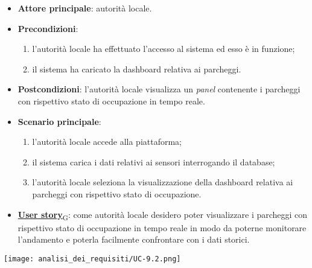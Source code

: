 \begin{itemize}
	\item \textbf{Attore principale}: autorità locale.
	\item \textbf{Precondizioni}:
	      \begin{enumerate}
		      \item l'autorità locale ha effettuato l'accesso al sistema ed esso è in funzione;
		      \item il sistema ha caricato la dashboard relativa ai parcheggi.
	      \end{enumerate}
	\item \textbf{Postcondizioni}: l'autorità locale visualizza un \textit{panel} contenente i parcheggi con rispettivo stato di occupazione in tempo reale.
	\item \textbf{Scenario principale}:
	      \begin{enumerate}
		      \item l'autorità locale accede alla piattaforma;
		      \item il sistema carica i dati relativi ai sensori interrogando il database;
		      \item l'autorità locale seleziona la visualizzazione della dashboard relativa ai parcheggi con rispettivo stato di occupazione.
	      \end{enumerate}
	\item \href{https://7last.github.io/docs/rtb/documentazione-interna/glossario\#user-story}{\textbf{User story}\textsubscript{G}}:
	      come autorità locale desidero poter visualizzare i parcheggi con rispettivo stato di occupazione in tempo reale in modo da poterne monitorare l'andamento
	      e poterla facilmente confrontare con i dati storici.
\end{itemize}
\begin{center}
	\texttt{[image: analisi\_dei\_requisiti/UC-9.2.png]}
\end{center}
